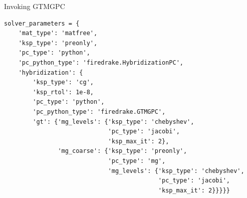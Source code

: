 \documentclass[9pt]{beamer}
\begin{document}
\begin{frame}[fragile]{Invoking GTMGPC}
\begin{verbatim}
solver_parameters = {
    'mat_type': 'matfree',
    'ksp_type': 'preonly',
    'pc_type': 'python',
    'pc_python_type': 'firedrake.HybridizationPC',
    'hybridization': {
        'ksp_type': 'cg',
        'ksp_rtol': 1e-8,
        'pc_type': 'python',
        'pc_python_type': 'firedrake.GTMGPC',
        'gt': {'mg_levels': {'ksp_type': 'chebyshev',
                             'pc_type': 'jacobi',
                             'ksp_max_it': 2},
               'mg_coarse': {'ksp_type': 'preonly',
                             'pc_type': 'mg',
                             'mg_levels': {'ksp_type': 'chebyshev',
                                           'pc_type': 'jacobi',
                                           'ksp_max_it': 2}}}}}
\end{verbatim}
\end{frame}
\end{document}
